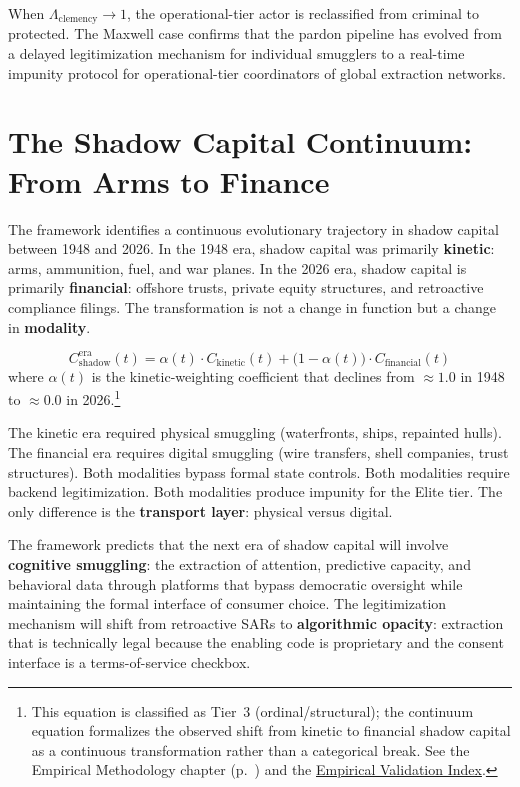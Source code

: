 When $\Lambda_{\text{clemency}} \rightarrow 1$, the operational-tier actor is reclassified from criminal to protected. The Maxwell case confirms that the pardon pipeline has evolved from a delayed legitimization mechanism for individual smugglers to a real-time impunity protocol for operational-tier coordinators of global extraction networks.

\section{The Shadow Capital Continuum: From Arms to Finance}

The framework identifies a continuous evolutionary trajectory in shadow capital between 1948 and 2026. In the 1948 era, shadow capital was primarily \textbf{kinetic}: arms, ammunition, fuel, and war planes. In the 2026 era, shadow capital is primarily \textbf{financial}: offshore trusts, private equity structures, and retroactive compliance filings. The transformation is not a change in function but a change in \textbf{modality}.

\begin{equation}\label{eq:gp13b-continuum}
C_{\text{shadow}}^{\text{era}}(t) = \alpha(t) \cdot C_{\text{kinetic}}(t) + \bigl(1 - \alpha(t)\bigr) \cdot C_{\text{financial}}(t)
\end{equation}
where $\alpha(t)$ is the kinetic-weighting coefficient that declines from $\approx 1.0$ in 1948 to $\approx 0.0$ in 2026.\footnote{This equation is classified as Tier~3 (ordinal/structural); the continuum equation formalizes the observed shift from kinetic to financial shadow capital as a continuous transformation rather than a categorical break. See the Empirical Methodology chapter (p.~\pageref{ch:empirical_methodology}) and the \hyperref[app:empirical_index]{Empirical Validation Index}.}

The kinetic era required physical smuggling (waterfronts, ships, repainted hulls). The financial era requires digital smuggling (wire transfers, shell companies, trust structures). Both modalities bypass formal state controls. Both modalities require backend legitimization. Both modalities produce impunity for the Elite tier. The only difference is the \textbf{transport layer}: physical versus digital.

The framework predicts that the next era of shadow capital will involve \textbf{cognitive smuggling}: the extraction of attention, predictive capacity, and behavioral data through platforms that bypass democratic oversight while maintaining the formal interface of consumer choice. The legitimization mechanism will shift from retroactive SARs to \textbf{algorithmic opacity}: extraction that is technically legal because the enabling code is proprietary and the consent interface is a terms-of-service checkbox.

